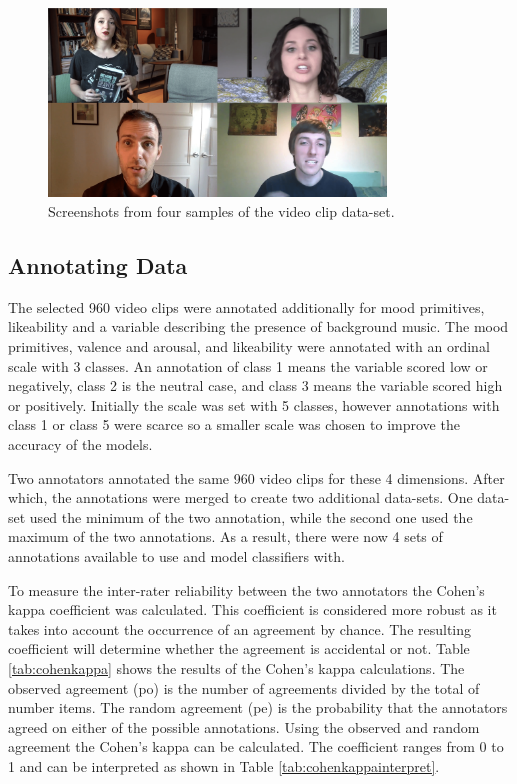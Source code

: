 \begin{figure}[h]
  \centering
  \includegraphics[width=0.8\textwidth]{Images/sample_video_clips-min.png}
  \caption{Screenshots from four samples of the video clip data-set.}
  \label{fig:ssvideoclip}
\end{figure}


\subsection{Annotating Data}
\label{subsection:annotatingdata}
The selected 960 video clips were annotated additionally for mood primitives, likeability and a variable describing the presence of background music. The mood primitives, valence and arousal, and likeability were annotated with an ordinal scale with 3 classes. An annotation of class 1 means the variable scored low or negatively, class 2 is the neutral case, and class 3 means the variable scored high or positively. Initially the scale was set with 5 classes, however annotations with class 1 or class 5 were scarce so a smaller scale was chosen to improve the accuracy of the models. 

Two annotators annotated the same 960 video clips for these 4 dimensions. After which, the annotations were merged to create two additional data-sets. One data-set used the minimum of the two annotation, while the second one used the maximum of the two annotations. As a result, there were now 4 sets of annotations available to use and model classifiers with.

To measure the inter-rater reliability between the two annotators the Cohen's kappa coefficient was calculated. This coefficient is considered more robust as it takes into account the occurrence of an agreement by chance. The resulting coefficient will determine whether the agreement is accidental or not. Table \ref{tab:cohenkappa} shows the results of the Cohen's kappa calculations. The observed agreement (po) is the number of agreements divided by the total of number items. The random agreement (pe) is the probability that the annotators agreed on either of the possible annotations. Using the observed and random agreement the Cohen's kappa can be calculated. The coefficient ranges from 0 to 1 and can be interpreted as shown in Table \ref{tab:cohenkappainterpret}.

